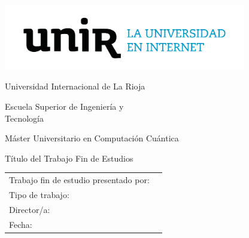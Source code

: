 \begin{center}
	\includegraphics[width=10.6cm,height=2.88cm]{logo}

	\Huge Universidad Internacional de La Rioja

	\huge Escuela Superior de Ingeniería y \\ Tecnología

	\vspace{100pt}

	\LARGE Máster Universitario en Computación Cuántica

	\Huge \textcolor{unir-azul-fuerte}{Título del Trabajo Fin de Estudios}
	\normalsize

	\vspace{100pt}

\end{center}
\begin{tabular}{ll}
	Trabajo fin de estudio presentado por: & \\
	Tipo de trabajo:                       & \\
	Director/a:                            & \\
	Fecha:                                 & \\
\end{tabular}
\newpage